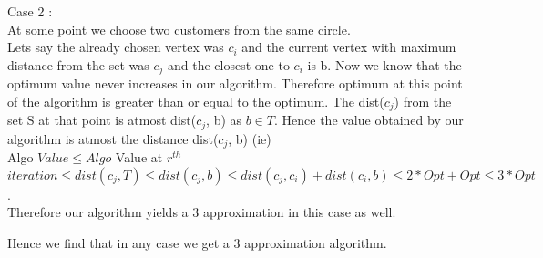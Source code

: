 \documentclass[solution,addpoints,12pt]{exam}
\begin{document}
\begin{questions}
\begin{parts}
Case 2 :\\
At some point we choose two customers from the same circle.\\

Lets say the already chosen vertex was $c_i$ and the current vertex
with maximum distance from the set was $c_j$ and the closest one to $c_i$
is b. Now we know that the optimum value never increases in our algorithm.
Therefore optimum at this point of the algorithm is greater than or
equal to the optimum. The dist($c_j$) from the set S at that point
is atmost dist($c_j$, b) as $b \in T$. Hence the value
obtained by our algorithm is atmost the distance dist($c_j$, b) (ie)\\
Algo $Value \le Algo$ Value at $r^{th}$ $iteration \le dist(c_j, T)
\le dist(c_j, b) \le dist(c_j, c_i) + dist(c_i, b) \le 2*Opt + Opt \le 3*Opt$.\\
Therefore our algorithm yields a 3 approximation in this case as well.

Hence we find that in any case we get a 3 approximation algorithm.

\end{parts}
\end{questions}
\end{document}
